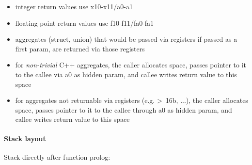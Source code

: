 \begin{itemize}
\item integer return values use x10-x11/a0-a1
\item floating-point return values use f10-f11/fa0-fa1
\item aggregates (struct, union) that would be passed via registers if passed as a first param, are returned via those registers
\item for {\it non-trivial} C++ aggregates, the caller allocates space, passes pointer to it to the callee via a0 as hidden param, and callee writes return value to this space
\item for aggregates not returnable via registers (e.g. \textgreater\ 16b, ...), the caller allocates space, passes pointer to it to the callee through
a0 as hidden param, and callee writes return value to this space
\end{itemize}

\paragraph{Stack layout}

Stack directly after function prolog:\\

